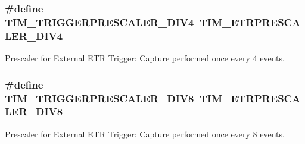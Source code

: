 \subsubsection[{\texorpdfstring{T\+I\+M\+\_\+\+T\+R\+I\+G\+G\+E\+R\+P\+R\+E\+S\+C\+A\+L\+E\+R\+\_\+\+D\+I\+V4}{TIM_TRIGGERPRESCALER_DIV4}}]{\setlength{\rightskip}{0pt plus 5cm}\#define T\+I\+M\+\_\+\+T\+R\+I\+G\+G\+E\+R\+P\+R\+E\+S\+C\+A\+L\+E\+R\+\_\+\+D\+I\+V4~{\bf T\+I\+M\+\_\+\+E\+T\+R\+P\+R\+E\+S\+C\+A\+L\+E\+R\+\_\+\+D\+I\+V4}}\hypertarget{group___t_i_m___trigger___prescaler_ga195dd56e15ea4733e19518fb431dfb8d}{}\label{group___t_i_m___trigger___prescaler_ga195dd56e15ea4733e19518fb431dfb8d}
Prescaler for External E\+TR Trigger\+: Capture performed once every 4 events. 
\subsubsection[{\texorpdfstring{T\+I\+M\+\_\+\+T\+R\+I\+G\+G\+E\+R\+P\+R\+E\+S\+C\+A\+L\+E\+R\+\_\+\+D\+I\+V8}{TIM_TRIGGERPRESCALER_DIV8}}]{\setlength{\rightskip}{0pt plus 5cm}\#define T\+I\+M\+\_\+\+T\+R\+I\+G\+G\+E\+R\+P\+R\+E\+S\+C\+A\+L\+E\+R\+\_\+\+D\+I\+V8~{\bf T\+I\+M\+\_\+\+E\+T\+R\+P\+R\+E\+S\+C\+A\+L\+E\+R\+\_\+\+D\+I\+V8}}\hypertarget{group___t_i_m___trigger___prescaler_ga78edbcf4caf228de0daa4b7f698f578f}{}\label{group___t_i_m___trigger___prescaler_ga78edbcf4caf228de0daa4b7f698f578f}
Prescaler for External E\+TR Trigger\+: Capture performed once every 8 events. 